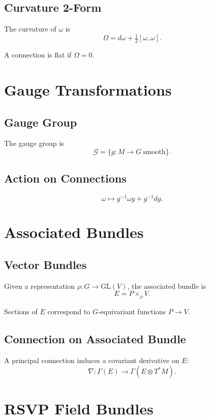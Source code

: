 \subsection{Curvature 2-Form}

The curvature of $\omega$ is
\[
\Omega = d\omega + \tfrac{1}{2}[\omega,\omega].
\]

\begin{definition}
A connection is flat if $\Omega = 0$.
\end{definition}

\section{Gauge Transformations}

\subsection{Gauge Group}

The gauge group is
\[
\mathcal{G} = \{ g : M\to G \ \text{smooth} \}.
\]

\subsection{Action on Connections}

\[
\omega \mapsto g^{-1}\omega g + g^{-1} dg.
\]

\section{Associated Bundles}

\subsection{Vector Bundles}

Given a representation $\rho : G\to \mathrm{GL}(V)$, the associated bundle is
\[
E = P \times_\rho V.
\]

Sections of $E$ correspond to $G$-equivariant functions $P\to V$.

\subsection{Connection on Associated Bundle}

A principal connection induces a covariant derivative on $E$:
\[
\nabla : \Gamma(E) \to \Gamma(E\otimes T^\ast M).
\]

\section{RSVP Field Bundles}

